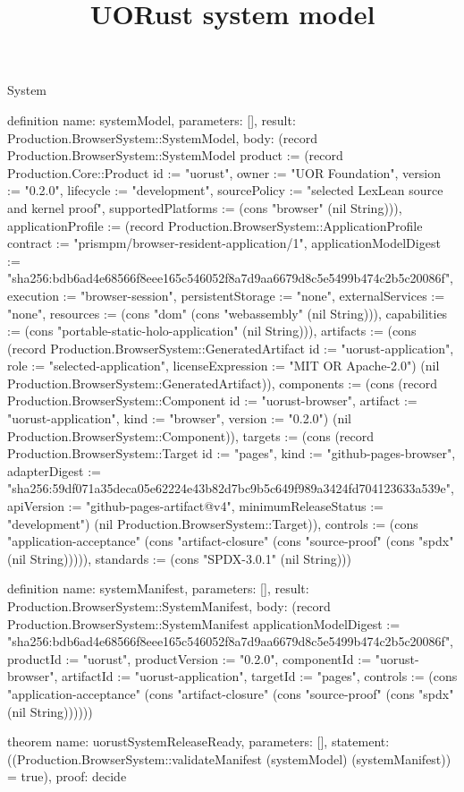 \begin{lexlean}{System}
\title{UORust system model}
\begin{semanticmodule}
definition{
  name: systemModel,
  parameters: [],
  result: Production.BrowserSystem::SystemModel,
  body: (record Production.BrowserSystem::SystemModel {product := (record Production.Core::Product {id := "uorust", owner := "UOR Foundation", version := "0.2.0", lifecycle := "development", sourcePolicy := "selected LexLean source and kernel proof", supportedPlatforms := (cons "browser" (nil String))}), applicationProfile := (record Production.BrowserSystem::ApplicationProfile {contract := "prismpm/browser-resident-application/1", applicationModelDigest := "sha256:bdb6ad4e68566f8eee165c546052f8a7d9aa6679d8c5e5499b474c2b5c20086f", execution := "browser-session", persistentStorage := "none", externalServices := "none", resources := (cons "dom" (cons "webassembly" (nil String))), capabilities := (cons "portable-static-holo-application" (nil String))}), artifacts := (cons (record Production.BrowserSystem::GeneratedArtifact {id := "uorust-application", role := "selected-application", licenseExpression := "MIT OR Apache-2.0"}) (nil Production.BrowserSystem::GeneratedArtifact)), components := (cons (record Production.BrowserSystem::Component {id := "uorust-browser", artifact := "uorust-application", kind := "browser", version := "0.2.0"}) (nil Production.BrowserSystem::Component)), targets := (cons (record Production.BrowserSystem::Target {id := "pages", kind := "github-pages-browser", adapterDigest := "sha256:59df071a35deca05e62224e43b82d7bc9b5c649f989a3424fd704123633a539e", apiVersion := "github-pages-artifact@v4", minimumReleaseStatus := "development"}) (nil Production.BrowserSystem::Target)), controls := (cons "application-acceptance" (cons "artifact-closure" (cons "source-proof" (cons "spdx" (nil String))))), standards := (cons "SPDX-3.0.1" (nil String))})
}

definition{
  name: systemManifest,
  parameters: [],
  result: Production.BrowserSystem::SystemManifest,
  body: (record Production.BrowserSystem::SystemManifest {applicationModelDigest := "sha256:bdb6ad4e68566f8eee165c546052f8a7d9aa6679d8c5e5499b474c2b5c20086f", productId := "uorust", productVersion := "0.2.0", componentId := "uorust-browser", artifactId := "uorust-application", targetId := "pages", controls := (cons "application-acceptance" (cons "artifact-closure" (cons "source-proof" (cons "spdx" (nil String)))))})
}

theorem{
  name: uorustSystemReleaseReady,
  parameters: [],
  statement: ((Production.BrowserSystem::validateManifest (systemModel) (systemManifest)) = true),
  proof: decide{}
}
\end{semanticmodule}
\end{lexlean}
